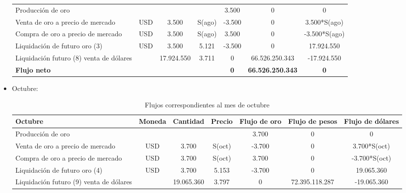 \documentclass{article}
\theoremstyle{remark}
\theoremstyle{definition}
\begin{document}
\begin{itemize}
\begin{table}[H]
\begin{tabular}{l|c c c|c c c}
Producción de oro 
&  &  &  & 3.500 & 0 & 0 \\

Venta de oro a precio de mercado 
& USD & 3.500 & S(ago) & -3.500 & 0 & 3.500*S(ago) \\

Compra de oro a precio de mercado 
& USD & 3.500 & S(ago) & 3.500 & 0 & -3.500*S(ago) \\

Liquidación de futuro oro (3) 
& USD & 3.500 & 5.121 & -3.500 & 0 & 17.924.550 \\

Liquidación futuro (8) venta de dólares 
&  & 17.924.550 & 3.711 & 0 & 66.526.250.343 & -17.924.550 \\

\midrule

\textbf{Flujo neto} 
& \textbf{} 
& \textbf{} 
& \textbf{} 
& \textbf{0} 
& \textbf{66.526.250.343} 
& \textbf{0} \\

\bottomrule
\end{tabular}
\end{table}

\item Octubre:

\begin{table}[H]
\centering
\caption{Flujos correspondientes al mes de octubre}
\footnotesize
\renewcommand{\arraystretch}{1.2}

\begin{tabular}{l|c c c|c c c}
\toprule
\textbf{Octubre} & 
\textbf{Moneda} & 
\textbf{Cantidad} & 
\textbf{Precio} & 
\textbf{Flujo de oro} & 
\textbf{Flujo de pesos} & 
\textbf{Flujo de dólares} \\
\midrule

Producción de oro 
&  &  &  & 3.700 & 0 & 0 \\

Venta de oro a precio de mercado 
& USD & 3.700 & S(oct) & -3.700 & 0 & 3.700*S(oct) \\

Compra de oro a precio de mercado 
& USD & 3.700 & S(oct) & 3.700 & 0 & -3.700*S(oct) \\

Liquidación de futuro oro (4) 
& USD & 3.700 & 5.153 & -3.700 & 0 & 19.065.360 \\

Liquidación futuro (9) venta de dólares 
&  & 19.065.360 & 3.797 & 0 & 72.395.118.287 & -19.065.360 \\


\end{tabular}
\end{table}
\end{itemize}
\end{document}
